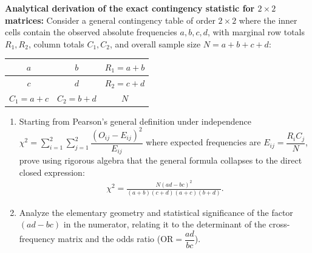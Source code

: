 \begin{problema}
	\label{prob:chi-desaf-contingencia-2x2}
	\textbf{Analytical derivation of the exact contingency statistic for $2 \times 2$ matrices:}
	Consider a general contingency table of order $2 \times 2$ where the inner cells contain the observed absolute frequencies $a, b, c, d$, with marginal row totals $R_1, R_2$, column totals $C_1, C_2$, and overall sample size $N = a+b+c+d$:
	\begin{center}
		\begin{tabular}{|c|c|c|}\hline
			$a$ & $b$ & $R_1 = a+b$ \\\hline
			$c$ & $d$ & $R_2 = c+d$ \\\hline
			$C_1 = a+c$ & $C_2 = b+d$ & $N$ \\\hline
		\end{tabular}
	\end{center}
	\begin{enumerate}
		\item Starting from Pearson's general definition under independence $\chi^2 = \sum_{i=1}^2 \sum_{j=1}^2 \dfrac{(O_{ij} - E_{ij})^2}{E_{ij}}$ where expected frequencies are $E_{ij} = \dfrac{R_i C_j}{N}$, prove using rigorous algebra that the general formula collapses to the direct closed expression:
		\begin{align}
			\chi^2 = \frac{N(ad - bc)^2}{(a+b)(c+d)(a+c)(b+d)}.
		\end{align}
		\item Analyze the elementary geometry and statistical significance of the factor $(ad - bc)$ in the numerator, relating it to the determinant of the cross-frequency matrix and the odds ratio ($\text{OR} = \dfrac{ad}{bc}$).
	\end{enumerate}
\end{problema}

